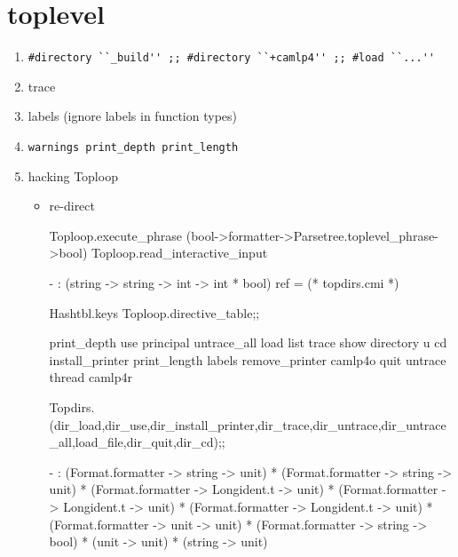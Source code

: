 

\section{toplevel}

\begin{enumerate}

\item \verb|#directory ``_build'' ;; #directory ``+camlp4'' ;; #load ``...''|
\item trace
\item labels (ignore labels in function types)
\item \verb|warnings print_depth print_length|
\item hacking Toploop
  \begin{itemize}
  \item re-direct 


\begin{ocamlcode}
Toploop.execute_phrase (bool->formatter->Parsetree.toplevel_phrase->bool)
Toploop.read_interactive_input
\end{ocamlcode}
\begin{ocamlcode}
- : (string -> string -> int -> int * bool) ref = (* topdirs.cmi *)
\end{ocamlcode}



\begin{ocamlcode}
  Hashtbl.keys Toploop.directive_table;;
\end{ocamlcode}

\begin{ocamlcode}
print_depth use principal untrace_all load list trace show directory u cd install_printer print_length labels remove_printer camlp4o quit untrace thread camlp4r  
\end{ocamlcode}


\begin{ocamlcode}
Topdirs.(dir_load,dir_use,dir_install_printer,dir_trace,dir_untrace,dir_untrace_all,load_file,dir_quit,dir_cd);;  
\end{ocamlcode}

\begin{ocamlcode}
- : (Format.formatter -> string -> unit) *
    (Format.formatter -> string -> unit) *
    (Format.formatter -> Longident.t -> unit) *
    (Format.formatter -> Longident.t -> unit) *
    (Format.formatter -> Longident.t -> unit) *
    (Format.formatter -> unit -> unit) *
    (Format.formatter -> string -> bool) * (unit -> unit) * (string -> unit)
\end{ocamlcode}





\end{itemize}
\end{enumerate}
